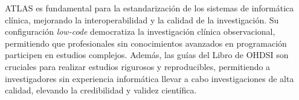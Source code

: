ATLAS es fundamental para la estandarización de los sistemas de informática clínica, mejorando la interoperabilidad y la calidad de la investigación. Su configuración \textit{low-code} democratiza la investigación clínica observacional, permitiendo que profesionales sin conocimientos avanzados en programación participen en estudios complejos. Además, las guías del Libro de OHDSI son cruciales para realizar estudios rigurosos y reproducibles, permitiendo a investigadores sin experiencia informática llevar a cabo investigaciones de alta calidad, elevando la credibilidad y validez científica.


